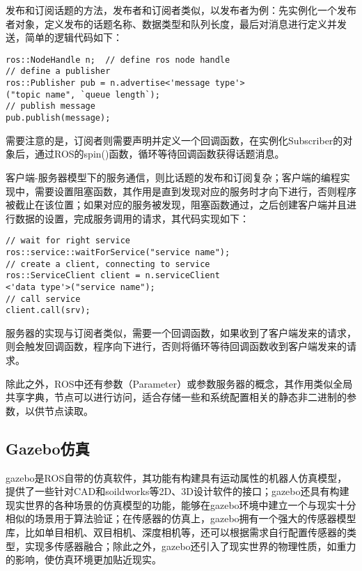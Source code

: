 发布和订阅话题的方法，发布者和订阅者类似，以发布者为例：先实例化一个发布者对象，定义发布的话题名称、数据类型和队列长度，最后对消息进行定义并发送，简单的逻辑代码如下：

\begin{verbatim}
ros::NodeHandle n;  // define ros node handle
// define a publisher
ros::Publisher pub = n.advertise<'message type'>
("topic name", `queue length`);
// publish message
pub.publish(message);
\end{verbatim}

需要注意的是，订阅者则需要声明并定义一个回调函数，在实例化Subscriber的对象后，通过ROS的spin()函数，循环等待回调函数获得话题消息。

客户端-服务器模型下的服务通信，则比话题的发布和订阅复杂；客户端的编程实现中，需要设置阻塞函数，其作用是直到发现对应的服务时才向下进行，否则程序被截止在该位置；如果对应的服务被发现，阻塞函数通过，之后创建客户端并且进行数据的设置，完成服务调用的请求，其代码实现如下：

\begin{verbatim}
// wait for right service
ros::service::waitForService("service name");
// create a client, connecting to service
ros::ServiceClient client = n.serviceClient
<'data type'>("service name");
// call service
client.call(srv);
\end{verbatim}

服务器的实现与订阅者类似，需要一个回调函数，如果收到了客户端发来的请求，则会触发回调函数，程序向下进行，否则将循环等待回调函数收到客户端发来的请求。

除此之外，ROS中还有参数（Parameter）或参数服务器的概念，其作用类似全局共享字典，节点可以进行访问，适合存储一些和系统配置相关的静态非二进制的参数，以供节点读取。


\subsection{Gazebo仿真} \label{2.1.2}
gazebo是ROS自带的仿真软件，其功能有构建具有运动属性的机器人仿真模型，提供了一些针对CAD和soildworks等2D、3D设计软件的接口；gazebo还具有构建现实世界的各种场景的仿真模型的功能，能够在gazebo环境中建立一个与现实十分相似的场景用于算法验证；在传感器的仿真上，gazebo拥有一个强大的传感器模型库，比如单目相机、双目相机、深度相机等，还可以根据需求自行配置传感器的类型，实现多传感器融合；除此之外，gazebo还引入了现实世界的物理性质，如重力的影响，使仿真环境更加贴近现实。

